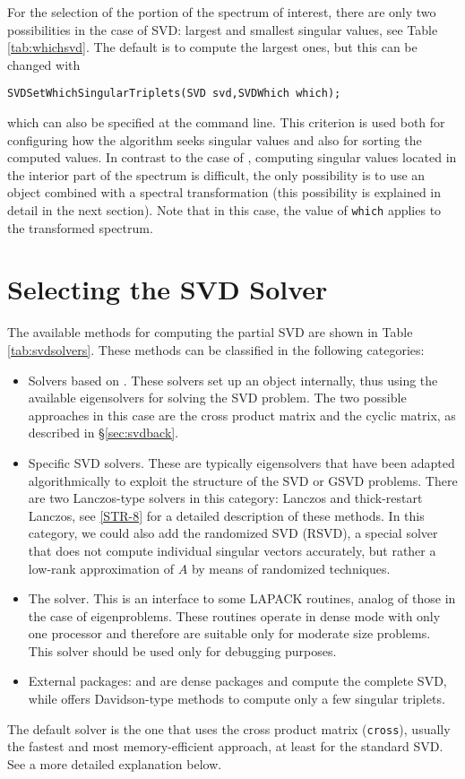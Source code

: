 	For the selection of the portion of the spectrum of interest, there are only two possibilities in the case of SVD: largest and smallest singular values, see Table \ref{tab:whichsvd}. The default is to compute the largest ones, but this can be changed with
	\begin{Verbatim}[fontsize=\small]
	SVDSetWhichSingularTriplets(SVD svd,SVDWhich which);
	\end{Verbatim}
which can also be specified at the command line. This criterion is used both for configuring how the algorithm seeks singular values and also for sorting the computed values. In contrast to the case of , computing singular values located in the interior part of the spectrum is difficult, the only possibility is to use an  object combined with a spectral transformation (this possibility is explained in detail in the next section). Note that in this case, the value of \Verb!which! applies to the transformed spectrum.

\section{Selecting the SVD Solver}

The available methods for computing the partial SVD are shown in Table \ref{tab:svdsolvers}. These methods can be classified in the following categories:
\begin{itemize}
\item Solvers based on . These solvers set up an  object internally, thus using the available eigensolvers for solving the SVD problem. The two possible approaches in this case are the cross product matrix and the cyclic matrix, as described in \S\ref{sec:svdback}.
\item Specific SVD solvers. These are typically eigensolvers that have been adapted algorithmically to exploit the structure of the SVD or GSVD problems. There are two Lanczos-type solvers in this category: Lanczos and thick-restart Lanczos, see \hyperlink{str}{[STR-8]} for a detailed description of these methods. In this category, we could also add the randomized SVD (RSVD), a special solver that does not compute individual singular vectors accurately, but rather a low-rank approximation of $A$ by means of randomized techniques.
\item The \lapack solver. This is an interface to some LAPACK routines, analog of those in the case of eigenproblems. These routines operate in dense mode with only one processor and therefore are suitable only for moderate size problems. This solver should be used only for debugging purposes.
\item External packages: \scalapack and \elemental are dense packages and compute the complete SVD, while \primme offers Davidson-type methods to compute only a few singular triplets.
\end{itemize}
The default solver is the one that uses the cross product matrix (\texttt{cross}), usually the fastest and most memory-efficient approach, at least for the standard SVD. See a more detailed explanation below.

